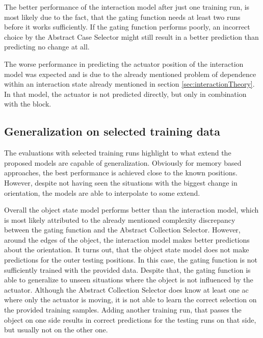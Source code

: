 The better performance of the interaction model after just one training run, is most likely due to the fact, that the gating function needs at least two runs before it works sufficiently. If the gating function performs poorly, an incorrect choice by the Abstract Case Selector might still result in a better prediction than predicting no change at all.


The worse performance in predicting the actuator position of the interaction model was expected and is due to the already mentioned problem of dependence within an interaction state already mentioned in section \ref{sec:interactionTheory}. In that model, the actuator is not predicted directly, but only in combination with the block. 

\subsection{Generalization on selected training data}

The evaluations with selected training runs highlight to what extend the proposed models are capable of generalization. Obviously for memory based approaches, the best performance is achieved close to the known positions. However, despite not having seen the situations with the biggest change in orientation, the models are able to interpolate to some extend. 

Overall the object state model performs better than the interaction model, which is most likely attributed to the already mentioned complexity discrepancy between the gating function and the Abstract Collection Selector. 
However, around the edges of the object, the interaction model makes better predictions about the orientation. It turns out, that the object state model does not make predictions for the outer testing positions. In this case, the gating function is not sufficiently trained with the provided data.
Despite that, the gating function is able to generalize to unseen situations where the object is not influenced by the actuator. Although the Abstract Collection Selector does know at least one \gls{ac} where only the actuator is moving, it is not able to learn the correct selection on the provided training samples.
Adding another training run, that passes the object on one side results in correct predictions for the testing runs on that side, but usually not on the other one.

